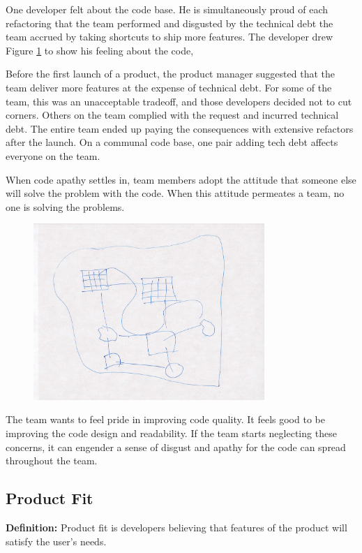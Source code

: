 One developer felt  about the code base. He is simultaneously proud of each refactoring that the team performed and disgusted by the technical debt the team accrued by taking shortcuts to ship more features. The developer drew Figure \ref{Programmer1} to show his feeling about the code, 


Before the first launch of a product, the product manager suggested that the team deliver more features at the expense of technical debt. For some of the team, this was an unacceptable tradeoff, and those developers decided not to cut corners. Others on the team complied with the request and incurred technical debt. The entire team ended up paying the consequences with extensive refactors after the launch. On a communal code base, one pair adding tech debt affects everyone on the team.


When code apathy settles in, team members adopt the attitude that someone else will solve the problem with the code. When this attitude permeates a team, no one is solving the problems. 


\begin{figure}[t]
\centering
\includegraphics[width=3.45in]{team_code_ownership_images/CodeOwnership.jpg}
\caption{}
\label{Programmer1}
\end{figure}


The team wants to feel pride in improving code quality.  It feels good to be improving the code design and readability. If the team starts neglecting these concerns, it can engender a sense of disgust and apathy for the code can spread throughout the team.


\subsection{Product Fit}
\textbf{Definition:} Product fit is developers believing that features of the product will satisfy the user's needs.


